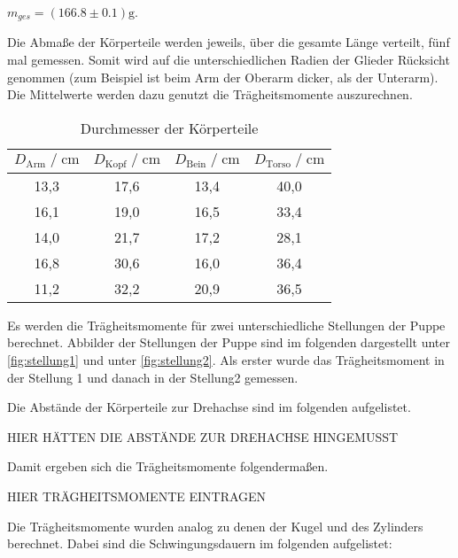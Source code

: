 \begin{center}
  $m_{ges} = (166.8\pm 0.1)\si{\gram}$.
\end{center}

Die Abmaße der Körperteile werden jeweils, über die gesamte Länge verteilt, fünf mal gemessen. Somit wird auf die unterschiedlichen
Radien der Glieder Rücksicht genommen (zum Beispiel ist beim Arm der Oberarm dicker, als der Unterarm). Die Mittelwerte werden dazu genutzt die
Trägheitsmomente auszurechnen.

\begin{table}
  \centering
    \caption{Durchmesser der Körperteile}
    \label{tab:durchmesser}
    \begin{tabular}{c c c c}
    \toprule
    $D_\text{Arm} \;/\; \si{\centi\meter}$ & $D_\text{Kopf} \;/\; \si{\centi\meter}$ & $D_\text{Bein} \;/\; \si{\centi\meter}$ & $D_\text{Torso} \;/\; \si{\centi\meter}$ \\
    \midrule
    13,3 & 17,6 & 13,4 & 40,0 \\
    16,1 & 19,0 & 16,5 & 33,4 \\
    14,0 & 21,7 & 17,2 & 28,1 \\
    16,8 & 30,6 & 16,0 & 36,4 \\
    11,2 & 32,2 & 20,9 & 36,5 \\
    \bottomrule
  \end{tabular}
\end{table}

Es werden die Trägheitsmomente für zwei unterschiedliche Stellungen der Puppe berechnet. Abbilder der Stellungen der Puppe sind im folgenden
dargestellt unter \autoref{fig:stellung1} und unter \autoref{fig:stellung2}. 
Als erster wurde das Trägheitsmoment in der Stellung 1 und danach in der Stellung2 gemessen.



Die Abstände der Körperteile zur Drehachse sind im folgenden aufgelistet.

\begin{center}
  HIER HÄTTEN DIE ABSTÄNDE ZUR DREHACHSE HINGEMUSST
\end{center}

Damit ergeben sich die Trägheitsmomente folgendermaßen.
\begin{center}
  HIER TRÄGHEITSMOMENTE EINTRAGEN
\end{center}

Die Trägheitsmomente wurden analog zu denen der Kugel und des Zylinders berechnet. Dabei sind die Schwingungsdauern im folgenden
aufgelistet:

